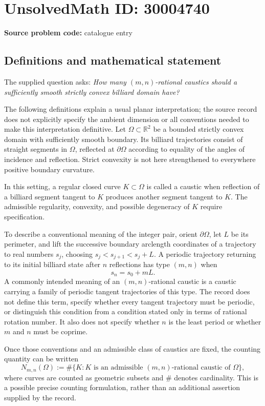 \documentclass[11pt]{article}
\newcommand{\R}{\mathbb{R}}
\begin{document}
\section*{UnsolvedMath ID: 30004740}
\textbf{Source problem code:} catalogue entry
\subsection{Definitions and mathematical statement}
The supplied question asks: \emph{How many \((m,n)\)-rational caustics should a sufficiently smooth strictly convex billiard domain have?}

The following definitions explain a usual planar interpretation; the source record does not explicitly specify the ambient dimension or all conventions needed to make this interpretation definitive. Let \(\Omega\subset\R^2\) be a bounded strictly convex domain with sufficiently smooth boundary. Its billiard trajectories consist of straight segments in \(\Omega\), reflected at \(\partial\Omega\) according to equality of the angles of incidence and reflection. Strict convexity is not here strengthened to everywhere positive boundary curvature.

In this setting, a regular closed curve \(K\subset\Omega\) is called a caustic when reflection of a billiard segment tangent to \(K\) produces another segment tangent to \(K\). The admissible regularity, convexity, and possible degeneracy of \(K\) require specification.

To describe a conventional meaning of the integer pair, orient \(\partial\Omega\), let \(L\) be its perimeter, and lift the successive boundary arclength coordinates of a trajectory to real numbers \(s_j\), choosing \(s_j<s_{j+1}<s_j+L\). A periodic trajectory returning to its initial billiard state after \(n\) reflections has type \((m,n)\) when
\[
 s_n=s_0+mL.
\]
A commonly intended meaning of an \((m,n)\)-rational caustic is a caustic carrying a family of periodic tangent trajectories of this type. The record does not define this term, specify whether every tangent trajectory must be periodic, or distinguish this condition from a condition stated only in terms of rational rotation number. It also does not specify whether \(n\) is the least period or whether \(m\) and \(n\) must be coprime.

Once those conventions and an admissible class of caustics are fixed, the counting quantity can be written
\[
 N_{m,n}(\Omega)
 :=\#\{K:K\text{ is an admissible }(m,n)\text{-rational caustic of }\Omega\},
\]
where curves are counted as geometric subsets and \(\#\) denotes cardinality. This is a possible precise counting formulation, rather than an additional assertion supplied by the record.
\end{document}
